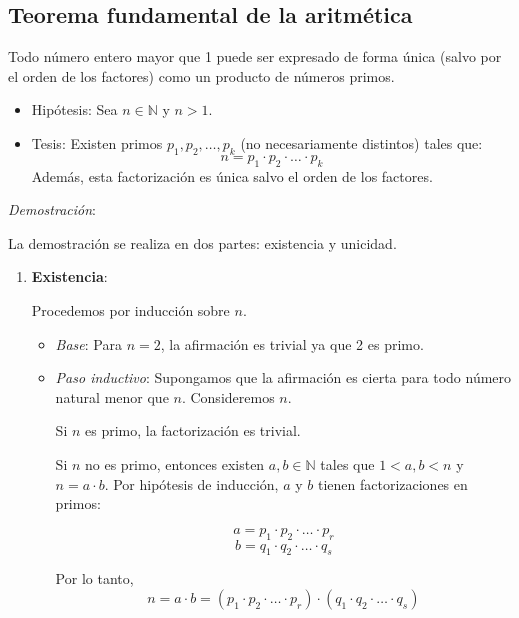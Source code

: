 \subsection{Teorema fundamental de la aritmética} \label{sec:arit}
\vspace{1em}
\begin{fmd-theorem}\label{teo:aritmetica}
	Todo número entero mayor que 1 puede ser expresado de forma única (salvo por el orden de los factores) como un producto de números primos.
\end{fmd-theorem}
\begin{fmd-proof}
	
\begin{itemize}
	\item Hipótesis: Sea $n \in \mathbb{N}$ y $n > 1$.
	\item Tesis: Existen primos $p_1, p_2, \ldots, p_k$ (no necesariamente distintos) tales que:
	\[n = p_1 \cdot p_2 \cdot \ldots \cdot p_k\]
	Además, esta factorización es única salvo el orden de los factores.
\end{itemize}

\textit{Demostración}:

La demostración se realiza en dos partes: existencia y unicidad.

\begin{enumerate}
	\item \textbf{Existencia}:
	
	Procedemos por inducción sobre $n$.
	
	\begin{itemize}
		\item \textit{Base}: Para $n = 2$, la afirmación es trivial ya que 2 es primo.
		
		\item \textit{Paso inductivo}: Supongamos que la afirmación es cierta para todo número natural menor que $n$. Consideremos $n$.
		
		Si $n$ es primo, la factorización es trivial.
		
		Si $n$ no es primo, entonces existen $a, b \in \mathbb{N}$ tales que $1 < a, b < n$ y $n = a \cdot b$. Por hipótesis de inducción, $a$ y $b$ tienen factorizaciones en primos:
		
		\[a = p_1 \cdot p_2 \cdot \ldots \cdot p_r\]
		\[b = q_1 \cdot q_2 \cdot \ldots \cdot q_s\]
		
		Por lo tanto,
		\[n = a \cdot b = (p_1 \cdot p_2 \cdot \ldots \cdot p_r) \cdot (q_1 \cdot q_2 \cdot \ldots \cdot q_s)\]
		

\end{itemize}
\end{enumerate}
\end{fmd-proof}
